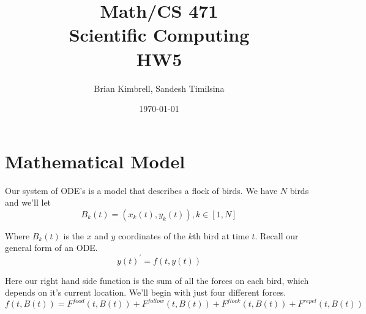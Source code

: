 \documentclass[12pt]{article}
\title{Math/CS 471 \\ Scientific Computing \\ HW5}
\author{Brian Kimbrell, Sandesh Timilsina}
\date{\today}
\begin{document}
\maketitle
\clearpage

\section{Mathematical Model}

Our system of ODE's is a model that describes a flock of birds. We have $N$ birds and we'll let
$$B_k(t) = (x_k(t),y_k(t)), k \in [1,N]$$

Where $B_k(t)$ is the $x$ and $y$ coordinates of the $k$th bird at time $t$.
Recall our general form of an ODE.
$$y(t)^\prime = f(t,y(t))$$

Here our right hand side function is the sum of all the forces on each bird, which depends on it's current location. We'll begin with just four different forces.
$$f(t,B(t)) = F^{food}(t,B(t)) + F^{follow}(t,B(t)) + F^{flock}(t,B(t)) + F^{repel}(t,B(t))$$
\end{document}
